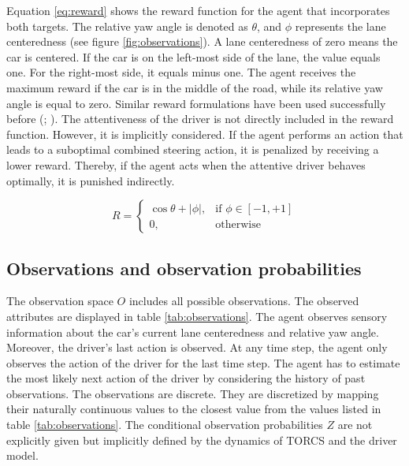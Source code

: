 Equation \ref{eq:reward} shows the reward function for the agent that incorporates both targets. The relative yaw angle is denoted as $\theta$, and $\phi$ represents the lane centeredness (see figure \ref{fig:observations}). A lane centeredness of zero means the car is centered. If the car is on the left-most side of the lane, the value equals one. For the right-most side, it equals minus one. The agent receives the maximum reward if the car is in the middle of the road, while its relative yaw angle is equal to zero. Similar reward formulations have been used successfully before (\cite{reward1}; \cite{reward2}). The attentiveness of the driver is not directly included in the reward function. However, it is implicitly considered. If the agent performs an action that leads to a suboptimal combined steering action, it is penalized by receiving a lower reward. Thereby, if the agent acts when the attentive driver behaves optimally, it is punished indirectly.

\begin{equation}
    \label{eq:reward}
    R = 
    \begin{cases}
        \cos \theta + |\phi|,& \text{if } \phi \in [-1,+1]\\
        0,              & \text{otherwise}
    \end{cases}
\end{equation}

\subsection{Observations and observation probabilities}
\label{sec:observations}



\noindent
The observation space $O$ includes all possible observations. The observed attributes are displayed in table \ref{tab:observations}. The agent observes sensory information about the car's current lane centeredness and relative yaw angle. Moreover, the driver's last action is observed. At any time step, the agent only observes the action of the driver for the last time step. The agent has to estimate the most likely next action of the driver by considering the history of past observations. The observations are discrete. They are discretized by mapping their naturally continuous values to the closest value from the values listed in table \ref{tab:observations}. The conditional observation probabilities $Z$ are not explicitly given but implicitly defined by the dynamics of TORCS and the driver model.

